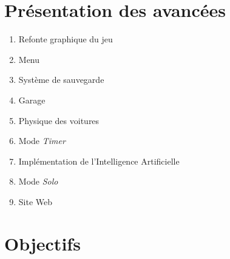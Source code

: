 \documentclass[12pt,a4paper]{article}
\newcommand{\AI}{Intelligence Artificielle}
\begin{document}
  \section{\large \bfseries Présentation des avancées}
  \begin{enumerate}
    \item Refonte graphique du jeu %

    \item Menu %

    \item Système de sauvegarde %

    \item Garage %
    
    \item Physique des voitures %

    \item Mode \textsl{Timer} %

    \item Implémentation de l'\AI %

    \item Mode \textsl{Solo} %

    \item Site Web %

  \end{enumerate}

  \section{\large \bfseries Objectifs} %
\end{document}
